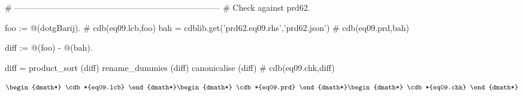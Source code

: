 \documentclass[12pt]{cdblatex}
\begin{document}
\clearpage

\begin{cadabra}
   # --------------------------------------------------------------------------
   # Check against prd62.

   foo := @(dotgBarij).                                # cdb(eq09.lcb,foo)
   bah  = cdblib.get('prd62.eq09.rhs','prd62.json')    # cdb(eq09.prd,bah)

   diff := @(foo) - @(bah).

   diff = product_sort (diff)
   rename_dummies (diff)
   canonicalise   (diff)                               # cdb(eq09.chk,diff)
\end{cadabra}


\begin{dgroup*}
   \begin{dmath*} \cdb*{eq09.lcb} \end{dmath*}
   \begin{dmath*} \cdb*{eq09.prd} \end{dmath*}
   \begin{dmath*} \cdb*{eq09.chk} \end{dmath*}
\end{dgroup*}
\end{document}
